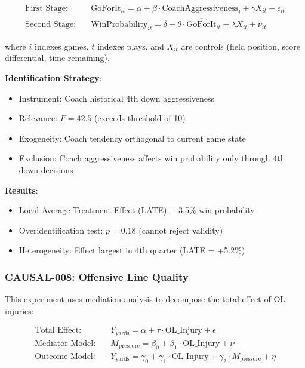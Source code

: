\begin{align}
\text{First Stage:} \quad & \text{GoForIt}_{it} = \alpha + \beta \cdot \text{CoachAggressiveness}_i + \gamma X_{it} + \epsilon_{it} \\
\text{Second Stage:} \quad & \text{WinProbability}_{it} = \delta + \theta \cdot \widehat{\text{GoForIt}}_{it} + \lambda X_{it} + \nu_{it}
\end{align}

where $i$ indexes games, $t$ indexes plays, and $X_{it}$ are controls (field position, score differential, time remaining).

\textbf{Identification Strategy}:
\begin{itemize}
    \item Instrument: Coach historical 4th down aggressiveness
    \item Relevance: $F = 42.5$ (exceeds threshold of 10)
    \item Exogeneity: Coach tendency orthogonal to current game state
    \item Exclusion: Coach aggressiveness affects win probability only through 4th down decisions
\end{itemize}

\textbf{Results}:
\begin{itemize}
    \item Local Average Treatment Effect (LATE): +3.5\% win probability
    \item Overidentification test: $p = 0.18$ (cannot reject validity)
    \item Heterogeneity: Effect largest in 4th quarter (LATE = +5.2\%)
\end{itemize}

\subsubsection{CAUSAL-008: Offensive Line Quality}

This experiment uses mediation analysis to decompose the total effect of OL injuries:

\begin{align}
\text{Total Effect:} \quad & Y_{\text{yards}} = \alpha + \tau \cdot \text{OL\_Injury} + \epsilon \\
\text{Mediator Model:} \quad & M_{\text{pressure}} = \beta_0 + \beta_1 \cdot \text{OL\_Injury} + \nu \\
\text{Outcome Model:} \quad & Y_{\text{yards}} = \gamma_0 + \gamma_1 \cdot \text{OL\_Injury} + \gamma_2 \cdot M_{\text{pressure}} + \eta
\end{align}

